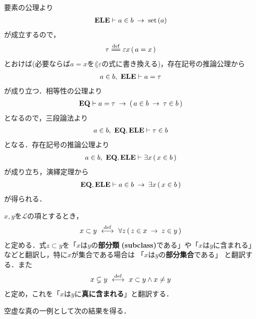 	\begin{prf}
		要素の公理より
		\begin{align}
			\mbox{{\bf ELE}} \vdash a \in b \hspace{0.25em}\rightarrow\hspace{0.25em} \operatorname*{set}\hspace{0.15em}(a)
		\end{align}
		が成立するので，
		\begin{align}
			\tau \defeq \varepsilon x\, (\, a = x\, )
		\end{align}
		とおけば(必要ならば$a = x$を$\lang{\varepsilon}$の式に書き換える)，存在記号の推論公理から
		\begin{align}
			a \in b,\ \mbox{{\bf ELE}} \vdash a = \tau
		\end{align}
		が成り立つ．相等性の公理より
		\begin{align}
			\mbox{{\bf EQ}} \vdash a = \tau \hspace{0.25em}\rightarrow\hspace{0.25em} (\, a \in b \hspace{0.25em}\rightarrow\hspace{0.25em} \tau \in b\, )
		\end{align}
		となるので，三段論法より
		\begin{align}
			a \in b,\ \mbox{{\bf EQ}},\mbox{{\bf ELE}} \vdash \tau \in b
		\end{align}
		となる．存在記号の推論公理より
		\begin{align}
			a \in b,\ \mbox{{\bf EQ}},\mbox{{\bf ELE}} \vdash \exists x\, (\, x \in b\, )
		\end{align}
		が成り立ち，演繹定理から
		\begin{align}
			\mbox{{\bf EQ}},\mbox{{\bf ELE}} \vdash a \in b \hspace{0.25em}\rightarrow\hspace{0.25em} \exists x\, (\, x \in b\, )
		\end{align}
		が得られる．
		\QED
	\end{prf}
	
	\begin{screen}
		\begin{dfn}[部分類]
			$x,y$を$\mathcal{L}$の項とするとき，
			\begin{align}
				x \subset y \ \overset{\mathrm{def}}{\longleftrightarrow}\ 
				\forall z\, (\, z \in x \hspace{0.25em}\rightarrow\hspace{0.25em} z \in y\, )
			\end{align}
			と定める．式$z \subset y$を「$x$は$y$の{\bf 部分類}
			{\bf (subclass)}である」や「$x$は$y$に含まれる」などと翻訳し，特に$x$が集合である場合は
			「$x$は$y$の{\bf 部分集合}である」
			と翻訳する．また
			\begin{align}
				x \subsetneq y \ \overset{\mathrm{def}}{\longleftrightarrow}\  x \subset y \wedge x \neq y
			\end{align}
			と定め，これを「$x$は$y$に{\bf 真に含まれる}」と翻訳する．
		\end{dfn}
	\end{screen}
	
	空虚な真の一例として次の結果を得る．
	
